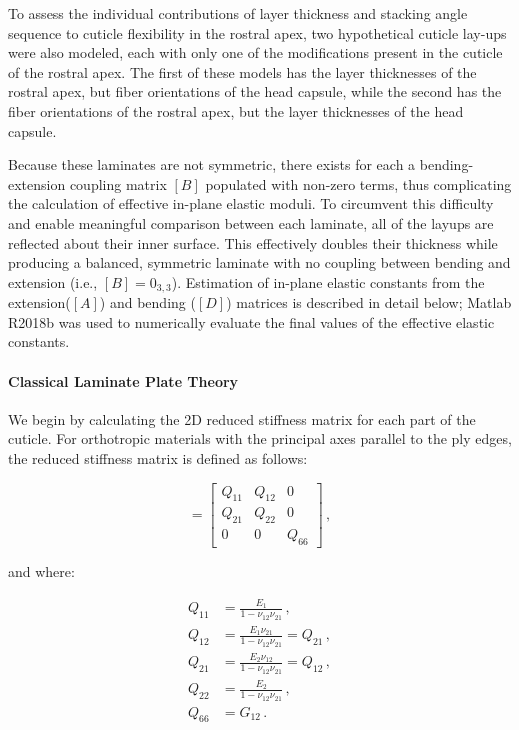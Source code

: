 \documentclass[twocolumn, linenumbers, superscriptaddress, nofootinbib]{revtex4-1}
\begin{document}
				To assess the individual contributions of layer thickness and stacking angle sequence to cuticle flexibility in the rostral apex, two hypothetical cuticle lay-ups were also modeled, each with only one of the modifications present in the cuticle of the rostral apex.
				The first of these models has the layer thicknesses of the rostral apex, but fiber orientations of the head capsule, while the second has the fiber orientations of the rostral apex, but the layer thicknesses of the head capsule.
				
				Because these laminates are not symmetric, there exists for each a bending-extension coupling matrix $[B]$ populated with non-zero terms, thus complicating the calculation of effective in-plane elastic moduli.
				To circumvent this difficulty and enable meaningful comparison between each laminate, all of the layups are reflected about their inner surface.
				This effectively doubles their thickness while producing a balanced, symmetric laminate with no coupling between bending and extension (i.e., $[B]=0_{3,3}$).
				Estimation of in-plane elastic constants from the extension($[A]$) and bending ($[D]$) matrices is described in detail below; Matlab R2018b was used to numerically evaluate the final values of the effective elastic constants.
				
			\paragraph*{Classical Laminate Plate Theory}
				We begin by calculating the 2D reduced stiffness matrix for each part of the cuticle.
				For orthotropic materials with the principal axes parallel to the ply edges, the reduced stiffness matrix is defined as follows:
				
				\begin{equation}
				[Q] =
					\begin{bmatrix}
						Q_{11} & Q_{12} & 0 \\
						Q_{21} & Q_{22} & 0 \\
						0 & 0 & Q_{66}
					\end{bmatrix}\,,
				\end{equation}
				
				and where:
				
				\begin{equation}
				\begin{aligned}
					Q_{11} & = \frac{E_{1}}{1 - \nu_{12}\nu_{21}}\,, \\
					Q_{12} & = \frac{E_{1}\nu_{21}}{1 - \nu_{12}\nu_{21}} = Q_{21}\,, \\
					Q_{21} & = \frac{E_{2}\nu_{12}}{1 - \nu_{12}\nu_{21}} = Q_{12}\,, \\
					Q_{22} & = \frac{E_{2}}{1 - \nu_{12}\nu_{21}}\,, \\
					Q_{66} & = G_{12}\,.
				\end{aligned}
				\end{equation}
				
\end{document}
